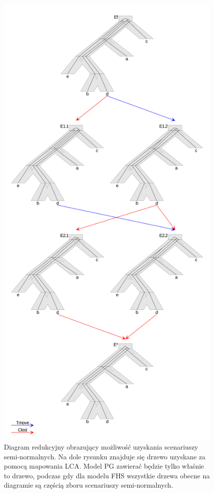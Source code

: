 \documentclass[licencjacka]{pracamgr}
\begin{document}
\begin{figure}[H]\label{diagram_red}
  \centering
  \includegraphics[width=\textwidth,height=\textheight,keepaspectratio]{./pictures/diagram.png}
  \caption{Diagram redukcyjny obrazujący możliwość uzyskania scenariuszy semi-normalnych. Na dole rysunku znajduje się drzewo uzyskane za pomocą mapowania LCA. Model PG zawierać będzie tylko właśnie to drzewo, podczas gdy dla modelu FHS wszystkie drzewa obecne na diagramie są częścią zboru scenariuszy semi-normalnych.}
\end{figure}
\end{document}
